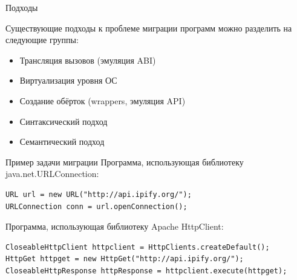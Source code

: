 \documentclass[12pt]{beamer}
\begin{document}
{
\begin{frame}{Подходы}
\begin{mybox}[]
Существующие подходы к проблеме миграции программ можно разделить на следующие группы:
\begin{itemize}
	\item Трансляция вызовов (эмуляция ABI)
	\item Виртуализация уровня ОС
	\item Создание обёрток (wrappers, эмуляция API)
	\item Синтаксический подход
	\item Семантический подход
\end{itemize}
\end{mybox}
\end{frame}
}

\begin{frame}[fragile]{Пример задачи миграции}
	Программа, использующая библиотеку java.net.URLConnection:
\begin{verbatim}
URL url = new URL("http://api.ipify.org/");
URLConnection conn = url.openConnection();
\end{verbatim}
	Программа, использующая библиотеку Apache HttpClient:
\begin{verbatim}
CloseableHttpClient httpclient = HttpClients.createDefault();
HttpGet httpget = new HttpGet("http://api.ipify.org/");
CloseableHttpResponse httpResponse = httpclient.execute(httpget);
\end{verbatim}
\end{frame}
\end{document}
